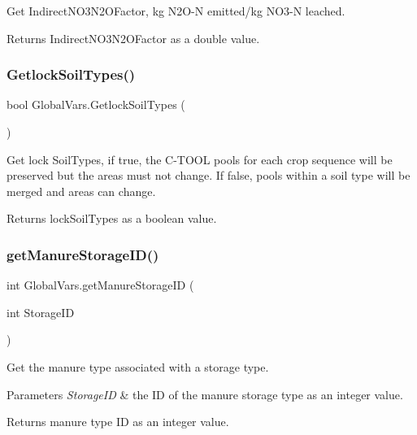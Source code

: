 Get Indirect\+N\+O3\+N2\+O\+Factor, kg N2\+O-\/N emitted/kg N\+O3-\/N leached. 

\begin{DoxyReturn}{Returns}
Indirect\+N\+O3\+N2\+O\+Factor as a double value. 
\end{DoxyReturn}
\mbox{\label{class_global_vars_aecb1271311c367bb97c21aa337a05447}} 
\subsubsection{\texorpdfstring{GetlockSoilTypes()}{GetlockSoilTypes()}}
{\footnotesize\ttfamily bool Global\+Vars.\+Getlock\+Soil\+Types (\begin{DoxyParamCaption}{ }\end{DoxyParamCaption})\hspace{0.3cm}{\ttfamily [inline]}}



Get lock Soil\+Types, if true, the C-\/\+T\+O\+OL pools for each crop sequence will be preserved but the areas must not change. If false, pools within a soil type will be merged and areas can change. 

\begin{DoxyReturn}{Returns}
lock\+Soil\+Types as a boolean value. 
\end{DoxyReturn}
\mbox{\label{class_global_vars_ae2f4d6e549b93b918adc8ec6d8f29bf4}} 
\subsubsection{\texorpdfstring{getManureStorageID()}{getManureStorageID()}}
{\footnotesize\ttfamily int Global\+Vars.\+get\+Manure\+Storage\+ID (\begin{DoxyParamCaption}\item[{int}]{Storage\+ID }\end{DoxyParamCaption})\hspace{0.3cm}{\ttfamily [inline]}}



Get the manure type associated with a storage type. 


\begin{DoxyParams}{Parameters}
{\em Storage\+ID} & the ID of the manure storage type as an integer value. \\
\hline
\end{DoxyParams}
\begin{DoxyReturn}{Returns}
manure type ID as an integer value. 
\end{DoxyReturn}
\mbox{\label{class_global_vars_afda3fc18e970456a249b8f14b5766f60}} 
